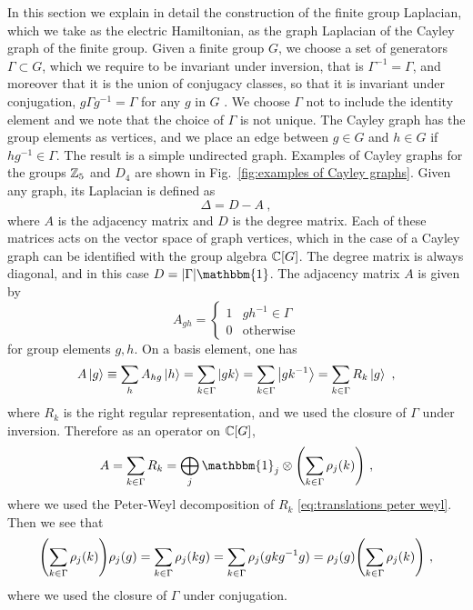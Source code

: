 In this section we explain in detail the construction of the finite group Laplacian, which we take as the electric Hamiltonian, as the graph Laplacian of the Cayley graph of the finite group.
Given a finite group $G$, we choose a set of generators $\Gamma \subset G$, which we require to be invariant under inversion, that is $\Gamma^{-1}=\Gamma$, and moreover that it is the union of conjugacy classes, so that it is invariant under conjugation, $g \Gamma g^{-1}=\Gamma$ for any $g$ in $G$ \cite{spectralgraphtheory}.
We choose $\Gamma$ not to include the identity element and we note that the choice of $\Gamma$ is not unique.
The Cayley graph has the group elements as vertices, and we place an edge between $g \in G$ and $h \in G$ if $h g^{-1} \in \Gamma$.
The result is a simple undirected graph.
Examples of Cayley graphs for the groups $\mathbb{Z}_5$ and $D_4$ are shown in Fig.~\ref{fig:examples of Cayley graphs}.
Given any graph, its Laplacian is defined as \cite{spectralgraphtheory}
\begin{equation}
    \Delta = D-A \ ,
\end{equation}
where $A$ is the adjacency matrix and $D$ is the degree matrix.
Each of these matrices acts on the vector space of graph vertices, which in the case of a Cayley graph can be identified with the group algebra $\mathbb{C}[G]$.
The degree matrix is always diagonal, and in this case $D=\abs{\Gamma} \mathbbm{1}$.
The adjacency matrix $A$ is given by
\begin{equation}
    A_{gh} = \begin{cases}1 & g h^{-1} \in \Gamma\\ 0 & \mathrm{otherwise}\end{cases}
\end{equation}
for group elements $g,h$.
On a basis element, one has
\begin{equation}
    A \ket{g} \equiv \sum_h A_{hg} \ket{h} = \sum_{k \in \Gamma} \ket{gk} = \sum_{k \in \Gamma} \ket{gk^{-1}} = \sum_{k \in \Gamma} R_k \ket{g} \ ,
\end{equation}
where $R_k$ is the right regular representation, and we used the closure of $\Gamma$ under inversion.
Therefore as an operator on $\mathbb{C}[G]$,
\begin{equation}
    A = \sum_{k \in \Gamma} R_k = \bigoplus_j \mathbbm{1}_j \otimes \pqty{\sum_{k \in \Gamma} \rho_j(k)} \ ,
\end{equation}
where we used the Peter-Weyl decomposition of $R_k$ \eqref{eq:translations peter weyl}.
Then we see that
\begin{equation}
    \pqty{\sum_{k \in \Gamma} \rho_j(k)} \rho_j(g) = \sum_{k \in \Gamma} \rho_j(kg) = \sum_{k \in \Gamma} \rho_j(g k g^{-1} g) = \rho_j(g) \pqty{\sum_{k \in \Gamma} \rho_j(k)} \ ,
\end{equation}
where we used the closure of $\Gamma$ under conjugation.

